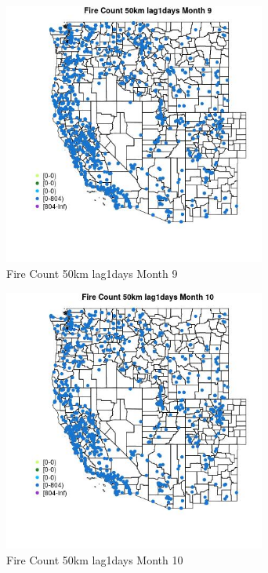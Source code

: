 \begin{figure} 
\centering  
\includegraphics[width=0.77\textwidth]{Code_Outputs/Report_ML_input_PM25_Step4_part_f_de_duplicated_aveswNAs_MapObsMo9Fire_Count_50km_lag1days.jpg} 
\caption{\label{fig:Report_ML_input_PM25_Step4_part_f_de_duplicated_aveswNAsMapObsMo9Fire_Count_50km_lag1days}Fire Count 50km lag1days Month 9} 
\end{figure} 
 

\begin{figure} 
\centering  
\includegraphics[width=0.77\textwidth]{Code_Outputs/Report_ML_input_PM25_Step4_part_f_de_duplicated_aveswNAs_MapObsMo10Fire_Count_50km_lag1days.jpg} 
\caption{\label{fig:Report_ML_input_PM25_Step4_part_f_de_duplicated_aveswNAsMapObsMo10Fire_Count_50km_lag1days}Fire Count 50km lag1days Month 10} 
\end{figure} 
 

